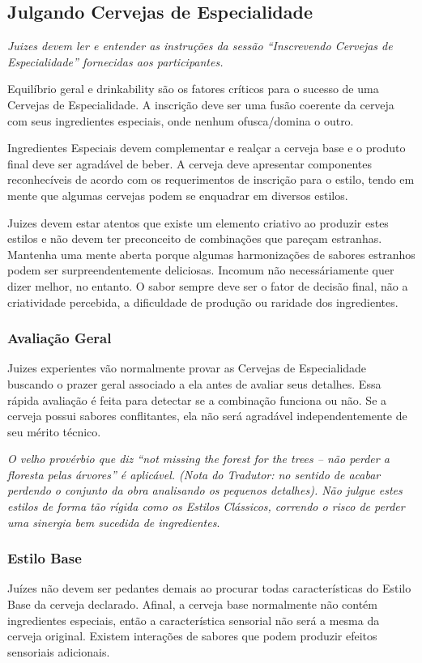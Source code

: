 \subsection*{Julgando Cervejas de Especialidade}
\textit{Juizes devem ler e entender as instruções da sessão “Inscrevendo Cervejas de Especialidade” fornecidas aos participantes.}

Equilíbrio geral e drinkability são os fatores críticos para o sucesso de uma Cervejas de Especialidade. A inscrição deve ser uma fusão coerente da cerveja com seus ingredientes especiais, onde nenhum ofusca/domina o outro.

Ingredientes Especiais devem complementar e realçar a cerveja base e o produto final deve ser agradável de beber. A cerveja deve apresentar componentes reconhecíveis de acordo com os requerimentos de inscrição para o estilo, tendo em mente que algumas cervejas podem se enquadrar em diversos estilos.

Juizes devem estar atentos que existe um elemento criativo ao produzir estes estilos e não devem ter preconceito de combinações que pareçam estranhas. Mantenha uma mente aberta porque algumas harmonizações de sabores estranhos podem ser surpreendentemente deliciosas. Incomum não necessáriamente quer dizer melhor, no entanto. O sabor sempre deve ser o fator de decisão final, não a criatividade percebida, a dificuldade de produção ou raridade dos ingredientes.

\subsubsection*{Avaliação Geral}
Juizes experientes vão normalmente provar as Cervejas de Especialidade buscando o prazer geral associado a ela antes de avaliar seus detalhes. Essa rápida avaliação é feita para detectar se a combinação funciona ou não. Se a cerveja possui sabores conflitantes, ela não será agradável independentemente de seu mérito técnico.

\textit{O velho provérbio que diz “not missing the forest for the trees – não perder a floresta pelas árvores” é aplicável. (Nota do Tradutor: no sentido de acabar perdendo o conjunto da obra analisando os pequenos detalhes). Não julgue estes estilos de forma tão rígida como os Estilos Clássicos, correndo o risco de perder uma sinergia bem sucedida de ingredientes}.

\subsubsection*{Estilo Base}
Juízes não devem ser pedantes demais ao procurar todas características do Estilo Base da cerveja declarado. Afinal, a cerveja base normalmente não contém ingredientes especiais, então a característica sensorial não será a mesma da cerveja original. Existem interações de sabores que podem produzir efeitos sensoriais adicionais.

